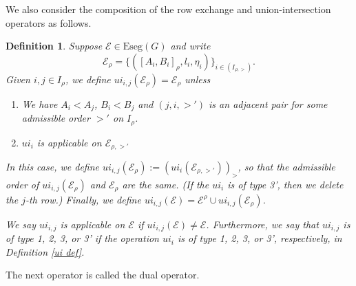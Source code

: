 \documentclass[11pt,letterpaper]{amsart}
\newcommand{\Eseg}{{\mathrm{Eseg}}}
\newcommand{\EE}{\mathcal{E}}
\newtheorem{defn}[thm]{Definition}
\numberwithin{equation}{section}
\begin{document}
We also consider the composition of the row exchange and union-intersection operators as follows.

\begin{defn} \label{def ui}
Suppose $\EE\in\Eseg(G)$ and write
\[\EE_{\rho}=\{ ([A_i,B_i]_{\rho},l_i,\eta_i)\}_{i\in (I_{\rho,>})}.\] 
Given $i,j \in I_{\rho}$, we define $ui_{i,j}(\EE_{\rho})=\EE_{\rho}$ unless
\begin{enumerate}
    \item [1.] We have $ A_i< A_j$, $B_i <B_j$ and $(j,i,>')$ is an adjacent pair for some admissible order $>'$ on $I_{\rho}$. 
    \item [2.] $ui_i$ is applicable on $\EE_{\rho,>'}$
\end{enumerate}
In this case, we define $ui_{i,j}(\EE_{\rho}):=(ui_{i}(\EE_{\rho,>'}))_{>}$, so that the admissible order of $ui_{i,j}(\EE_{\rho})$ and $\EE_{\rho}$ are the same. (If the $ui_i$ is of type 3', then we delete the $j$-th row.) Finally, we define $ui_{i,j}(\EE)= \EE^{\rho} \cup ui_{i,j}(\EE_{\rho})$.

We say $ui_{i,j}$ is applicable on $\EE$ if $ui_{i,j}(\EE) \neq \EE$. Furthermore, we say that $ui_{i,j}$ is of type 1, 2, 3, or 3' if the operation $ui_i$ is of type 1, 2, 3, or 3', respectively, in Definition \ref{ui def}.
\end{defn}


The next operator is called the dual operator.
  
\end{document}
